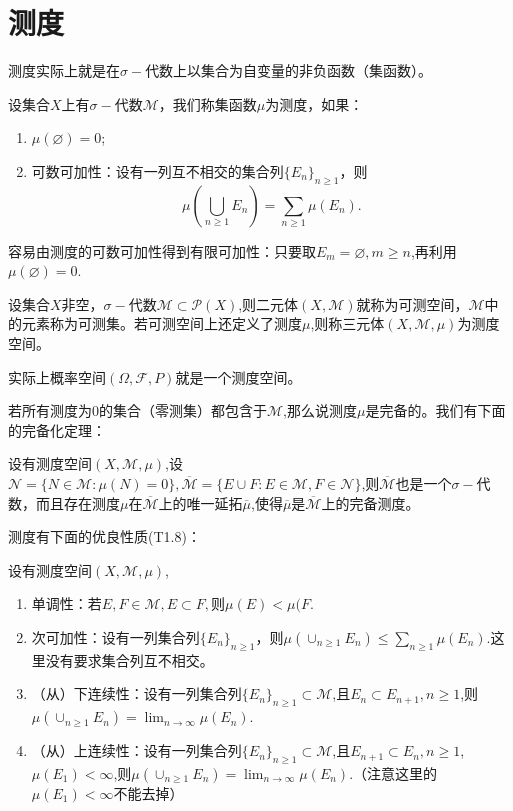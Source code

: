 \documentclass[lang=cn,10pt]{elegantbook}
\begin{document}
	\section{测度}
	测度实际上就是在\(\sigma-\)代数上以集合为自变量的非负函数（集函数）。
	\begin{definition}[测度]
		设集合\(X\)上有\(\sigma-\)代数\(\mathcal{M}\)，我们称集函数\(\mu\)为测度，如果：
		\begin{enumerate}
			\item \(\mu(\varnothing)=0\);
			\item 可数可加性：设有一列互不相交的集合列\(\{E_n\}_{n\ge 1}\)，则
			\[\mu(\bigcup_{n\ge 1}E_n)=\sum_{n\ge 1}\mu(E_n).\]
		\end{enumerate}
	\end{definition}
	容易由测度的可数可加性得到有限可加性：只要取\(E_m=\varnothing,m\ge n\),再利用\(\mu(\varnothing)=0\).
	\begin{definition}[测度空间]
		设集合\(X\)非空，\(\sigma-\)代数\(\mathcal{M}\subset \mathcal{P}(X)\),则二元体\((X,\mathcal{M})\)就称为可测空间，\(\mathcal{M}\)中的元素称为可测集。若可测空间上还定义了测度\(\mu\),则称三元体\((X,\mathcal{M},\mu)\)为测度空间。
	\end{definition}
	\begin{note}
		实际上概率空间\((\Omega,\mathcal{F},P)\)就是一个测度空间。
	\end{note}
	若所有测度为0的集合（零测集）都包含于\(\mathcal{M}\),那么说测度\(\mu\)是完备的。我们有下面的完备化定理：
	\begin{theorem}[完备化]
		设有测度空间\((X,\mathcal{M},\mu)\),设\(\mathcal{N}=\{N\in\mathcal{M}:\mu(N)=0\},\overline{\mathcal{M}}=\{E\cup F:E\in \mathcal{M},F\in \mathcal{N}\}\),则\(\overline{\mathcal{M}}\)也是一个\(\sigma-\)代数，而且存在测度\(\mu\)在\(\overline{\mathcal{M}}\)上的唯一延拓\(\overline{\mu}\),使得\(\overline{\mu}\)是\(\overline{\mathcal{M}}\)上的完备测度。
	\end{theorem}
	测度有下面的优良性质(T1.8)：
	\begin{property}
		设有测度空间\((X,\mathcal{M},\mu)\),
		\begin{enumerate}
			\item 单调性：若\(E,F\in \mathcal{M},E\subset F,\)则\(\mu(E)<\mu(F\).
			\item 次可加性：设有一列集合列\(\{E_n\}_{n\ge 1}\)，则\(\mu(\cup_{n\ge 1}E_n)\le \sum_{n\ge 1}\mu(E_n)\).这里没有要求集合列互不相交。
			\item （从）下连续性：设有一列集合列\(\{E_n\}_{n\ge 1}\subset \mathcal{M}\),且\(E_n\subset E_{n+1},n\ge 1\),则\(\mu(\cup_{n\ge 1}E_n)= \lim_{n\to \infty}\mu(E_n)\).
			\item （从）上连续性：设有一列集合列\(\{E_n\}_{n\ge 1}\subset \mathcal{M}\),且\(E_{n+1}\subset E_{n},n\ge 1\),\(\mu(E_1)<\infty\),则\(\mu(\cup_{n\ge 1}E_n)= \lim_{n\to \infty}\mu(E_n)\).（注意这里的\(\mu(E_1)<\infty\)不能去掉）
		\end{enumerate}
	\end{property}
\end{document}
